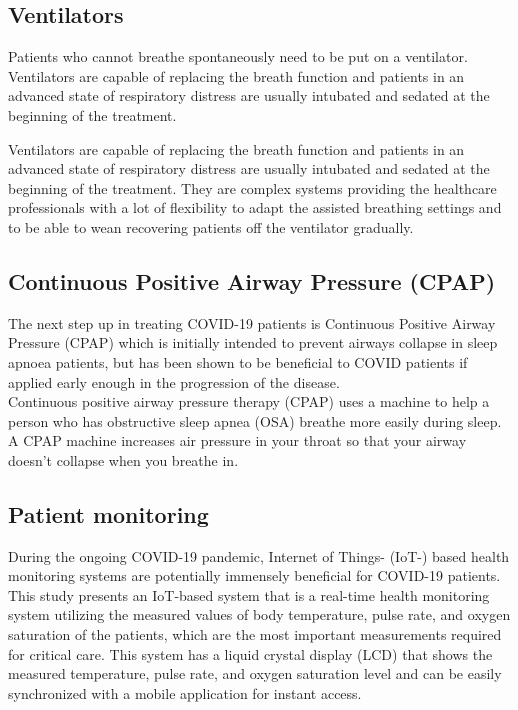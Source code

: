 \documentclass[12pt]{report}
\begin{document}
\subsection{Ventilators}
Patients who cannot breathe spontaneously need to be put on a ventilator. Ventilators are capable of replacing the breath function and patients in an advanced state of respiratory distress are usually intubated and sedated at the beginning of the treatment.

Ventilators are capable of replacing the breath function and patients in an advanced state of respiratory distress are usually intubated and sedated at the beginning of the treatment. They are complex systems providing the healthcare professionals with a lot of flexibility to adapt the assisted breathing settings and to be able to wean recovering patients off the ventilator gradually.

\subsection{Continuous Positive Airway Pressure (CPAP)}
The next step up in treating COVID-19 patients is Continuous Positive Airway Pressure (CPAP) which is initially intended to prevent airways collapse in sleep apnoea patients, but has been shown to be beneficial to COVID patients if applied early enough in the progression of the disease.\\

Continuous positive airway pressure therapy (CPAP) uses a machine to help a person who has obstructive sleep apnea (OSA) breathe more easily during sleep. A CPAP machine increases air pressure in your throat so that your airway doesn't collapse when you breathe in.

\subsection{Patient monitoring}
During the ongoing COVID-19 pandemic, Internet of Things- (IoT-) based health monitoring systems are potentially immensely beneficial for COVID-19 patients. This study presents an IoT-based system that is a real-time health monitoring system utilizing the measured values of body temperature, pulse rate, and oxygen saturation of the patients, which are the most important measurements required for critical care. This system has a liquid crystal display (LCD) that shows the measured temperature, pulse rate, and oxygen saturation level and can be easily synchronized with a mobile application for instant access.
\end{document}
